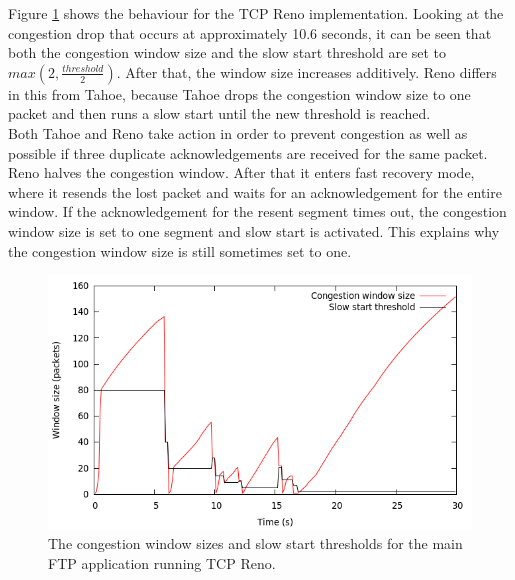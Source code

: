 \documentclass[a4paper,10pt]{article}
\begin{document}
\begin{enumerate}
 Figure \ref{fig:ex2congestionwindowreno} shows the behaviour for the TCP Reno implementation. Looking at the congestion drop
 that occurs at approximately 10.6 seconds, it can be seen that both the congestion window size and the slow start threshold
 are set to $max(2, \frac{threshold}{2})$. After that, the window size increases additively. Reno differs in this from
 Tahoe, because Tahoe drops the congestion window size to one packet and then runs a slow start until the new threshold
 is reached. \\
 
 Both Tahoe and Reno take action in order to prevent congestion as well as possible if three duplicate acknowledgements are
 received for the same packet. Reno halves the congestion window. After that it enters fast recovery mode, where it
 resends the lost packet and waits for an acknowledgement for the entire window. If the acknowledgement for
 the resent segment times out, the congestion window size is set to one segment and slow start is activated. This explains
 why the congestion window size is still sometimes set to one.
 
 \begin{figure}[h]
 \label{fig:ex2congestionwindowreno}
  \centering
    \includegraphics[scale=0.5]{ex2congestionwindowreno.png}
  \caption{The congestion window sizes and slow start thresholds for the main FTP application running TCP Reno.}
 \end{figure}
 
 
\end{enumerate}
\end{document}
